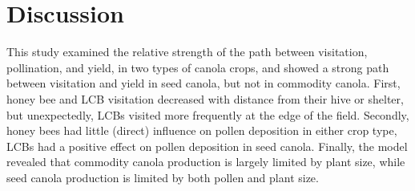 \documentclass[12pt]{article} %
\begin{document}
\section{Discussion}
This study examined the relative strength of the path between visitation, pollination, and yield, in two types of canola crops, and showed a strong path between visitation and yield in seed canola, but not in commodity canola.
First, honey bee and LCB visitation decreased with distance from their hive or shelter, but unexpectedly, LCBs visited more frequently at the edge of the field.
Secondly, honey bees had little (direct) influence on pollen deposition in either crop type, LCBs had a positive effect on pollen deposition in seed canola.
Finally, the model revealed that commodity canola production is largely limited by plant size, while seed canola production is limited by both pollen and plant size.
\end{document}
